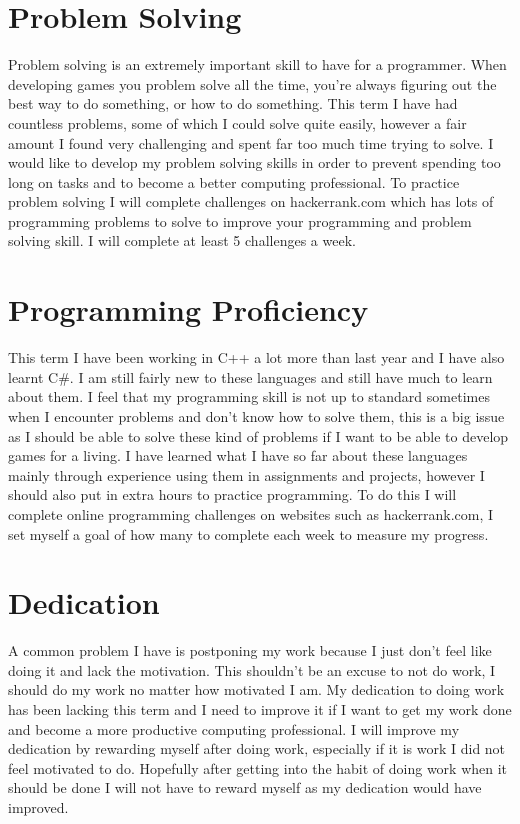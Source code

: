 \documentclass{scrartcl}
\begin{document}
\section{Problem Solving}
Problem solving is an extremely important skill to have for a programmer. When developing games you problem solve all the time, you're always figuring out the best way to do something, or how to do something. This term I have had countless problems, some of which I could solve quite easily, however a fair amount I found very challenging and spent far too much time trying to solve. I would like to develop my problem solving skills in order to prevent spending too long on tasks and to become a better computing professional. To practice problem solving I will complete challenges on hackerrank.com which has lots of programming problems to solve to improve your programming and problem solving skill. I will complete at least 5 challenges a week.

\section{Programming Proficiency}
This term I have been working in C++ a lot more than last year and I have also learnt C\#. I am still fairly new to these languages and still have much to learn about them. I feel that my programming skill is not up to standard sometimes when I encounter problems and don't know how to solve them, this is a big issue as I should be able to solve these kind of problems if I want to be able to develop games for a living. I have learned what I have so far about these languages mainly through experience using them in assignments and projects, however I should also put in extra hours to practice programming. To do this I will complete online programming challenges on websites such as hackerrank.com, I set myself a goal of how many to complete each week to measure my progress.

\section{Dedication}
A common problem I have is postponing my work because I just don't feel like doing it and lack the motivation. This shouldn't be an excuse to not do work, I should do my work no matter how motivated I am. My dedication to doing work has been lacking this term and I need to improve it if I want to get my work done and become a more productive computing professional. I will improve my dedication by rewarding myself after doing work, especially if it is work I did not feel motivated to do. Hopefully after getting into the habit of doing work when it should be done I will not have to reward myself as my dedication would have improved.
\end{document}
